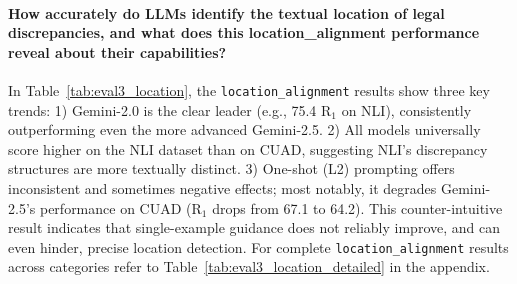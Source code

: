 \documentclass[11pt]{article}
\begin{document}
\paragraph{How accurately do LLMs identify the textual location of legal discrepancies, and what does this location\_alignment performance reveal about their capabilities?}
In Table~\ref{tab:eval3_location}, the \texttt{location\_alignment} results show three key trends: 1) Gemini-2.0 is the clear leader (e.g., 75.4 R$_1$ on NLI), consistently outperforming even the more advanced Gemini-2.5. 2) All models universally score higher on the NLI dataset than on CUAD, suggesting NLI's discrepancy structures are more textually distinct. 3) One-shot (L2) prompting offers inconsistent and sometimes negative effects; most notably, it degrades Gemini-2.5's performance on CUAD (R$_1$ drops from 67.1 to 64.2). This counter-intuitive result indicates that single-example guidance does not reliably improve, and can even hinder, precise location detection. For complete \texttt{location\_alignment} results across categories refer to Table~\ref{tab:eval3_location_detailed} in the appendix.
\end{document}
